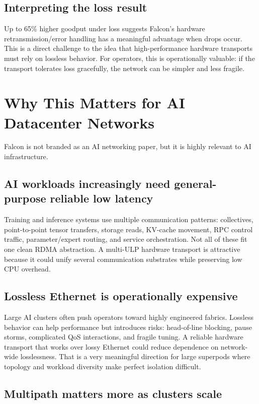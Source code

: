 \documentclass[11pt]{article}
\begin{document}
\subsection{Interpreting the loss result}

Up to 65\% higher goodput under loss suggests Falcon's hardware retransmission/error handling has a meaningful advantage when drops occur. This is a direct challenge to the idea that high-performance hardware transports must rely on lossless behavior. For operators, this is operationally valuable: if the transport tolerates loss gracefully, the network can be simpler and less fragile.

\section{Why This Matters for AI Datacenter Networks}

Falcon is not branded as an AI networking paper, but it is highly relevant to AI infrastructure.

\subsection{AI workloads increasingly need general-purpose reliable low latency}

Training and inference systems use multiple communication patterns: collectives, point-to-point tensor transfers, storage reads, KV-cache movement, RPC control traffic, parameter/expert routing, and service orchestration. Not all of these fit one clean RDMA abstraction. A multi-ULP hardware transport is attractive because it could unify several communication substrates while preserving low CPU overhead.

\subsection{Lossless Ethernet is operationally expensive}

Large AI clusters often push operators toward highly engineered fabrics. Lossless behavior can help performance but introduces risks: head-of-line blocking, pause storms, complicated QoS interactions, and fragile tuning. A reliable hardware transport that works over lossy Ethernet could reduce dependence on network-wide losslessness. That is a very meaningful direction for large superpods where topology and workload diversity make perfect isolation difficult.

\subsection{Multipath matters more as clusters scale}
\end{document}

